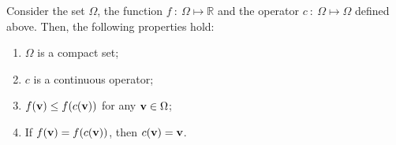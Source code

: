 \documentclass[
]{jss}
\begin{document}
\begin{lemma}
\label{lemma_for_prop}
Consider the set $\Omega$, the function $f~:~\Omega\mapsto\mathbb{R}$ and the 
operator $c~:~\Omega\mapsto\Omega$ defined above. Then, the following properties hold:
\begin{enumerate}
    \item \label{lemma_pt1} $\Omega$ is a compact set;
    \item \label{lemma_pt2} $c$ is a continuous operator;
    \item \label{lemma_pt3} $f(\mathbf{v})\leq f(c(\mathbf{v}))$ for any $\mathbf{v}\in\Omega$;
    \item \label{lemma_pt4} If $f(\mathbf{v}) = f(c(\mathbf{v}))$, then $c(\mathbf{v}) = \mathbf{v}$.
\end{enumerate}
\end{lemma}
\end{document}
